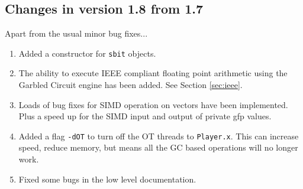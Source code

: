 \subsection{Changes in version 1.8 from 1.7}
Apart from the usual minor bug fixes...
\begin{enumerate}
\item Added a constructor for \verb|sbit| objects.
\item The ability to execute IEEE compliant floating point arithmetic
      using the Garbled Circuit engine has been added. 
      See Section \ref{sec:ieee}.
\item Loads of bug fixes for SIMD operation on vectors have
      been implemented. Plus a speed up for the SIMD input and
      output of private gfp values.
\item Added a flag \verb|-dOT| to turn off the OT threads to \verb|Player.x|.
      This can increase speed, reduce memory, but means all the GC
      based operations will no longer work.
\item Fixed some bugs in the low level documentation.
\end{enumerate}

